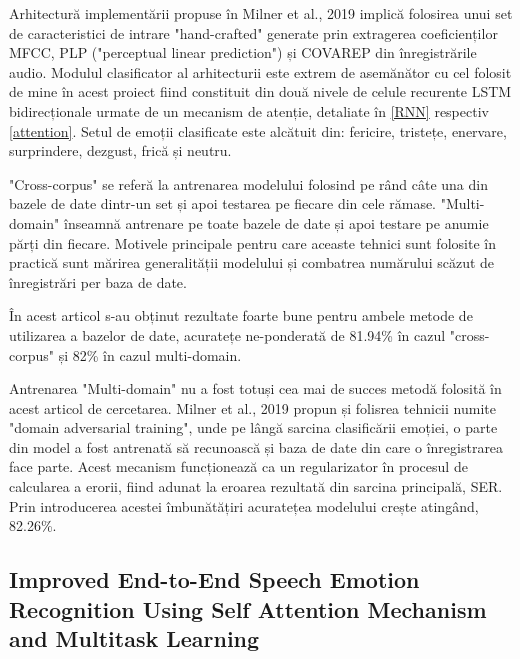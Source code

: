 \documentclass[a4paper,12pt]{book}
\begin{document}
					Arhitectură implementării propuse în Milner et al., 2019 \cite{multi-domain} implică folosirea unui set de caracteristici de intrare "hand-crafted" generate prin extragerea coeficienților MFCC, PLP ("perceptual linear prediction") și COVAREP \cite{covarep} din înregistrările audio. Modulul clasificator al arhitecturii este extrem de asemănător cu cel folosit de mine în acest proiect fiind constituit din două nivele de celule recurente LSTM bidirecționale  urmate de un mecanism de atenție, detaliate în \ref{RNN} respectiv \ref{attention}. Setul de emoții clasificate este alcătuit din: fericire, tristețe, enervare, surprindere, dezgust, frică și neutru. \par
					
					"Cross-corpus" se referă la antrenarea modelului folosind pe rând câte una din bazele de date dintr-un set și apoi testarea pe fiecare din cele rămase. "Multi-domain" înseamnă antrenare pe toate bazele de date și apoi testare pe anumie părți din fiecare. Motivele principale pentru care aceaste tehnici sunt folosite în practică sunt mărirea generalității modelului și combatrea numărului scăzut de înregistrări per baza de date. \par
					
					În acest articol s-au obținut rezultate foarte bune pentru ambele metode de utilizarea a bazelor de date, acuratețe ne-ponderată de  81.94\% în cazul "cross-corpus" și 82\% în cazul multi-domain. \par					
					
					Antrenarea "Multi-domain" nu a fost totuși cea mai de succes metodă folosită în acest articol de cercetarea. Milner et al., 2019 \cite{mulți-domain} propun și folisrea tehnicii numite "domain adversarial training", unde pe lângă sarcina clasificării emoției, o parte din model a fost antrenată să recunoască și baza de date din care o înregistrarea face parte. Acest mecanism funcționează ca un regularizator în procesul de calcularea a erorii, fiind adunat la eroarea rezultată din sarcina principală, SER. Prin introducerea acestei îmbunătățiri acuratețea modelului crește atingând, 82.26\%. \par
						
					\subsection{Improved End-to-End Speech Emotion Recognition Using Self Attention	Mechanism and Multitask Learning} \label{end-to-end2}
					
\end{document}
